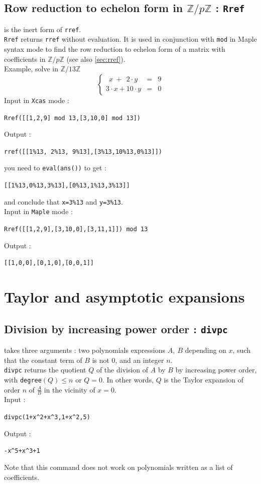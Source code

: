 \documentclass[a4paper,11pt]{book}
\newcommand{\Z}{{\mathbb{Z}}}
\begin{document}
\subsection{Row reduction to echelon form in $\Z/p\Z$ : {\tt Rref}}
  is the inert form of {\tt rref}.\\ 
{\tt Rref} returns {\tt rref} without
evaluation. 
It is used in conjunction with {\tt mod} in Maple syntax mode to 
find the row reduction to echelon form 
of a matrix with coefficients in $\Z/p\Z$ (see 
also \ref{sec:rref}).\\
Example, solve in $\Z/13\Z$
$$\left \{\begin{array}{lcr}\ \  x\ +\ \  2 \cdot y & = &9 \\3 \cdot x +10 \cdot y & =& 0 \end{array}\right.$$
Input in {\tt Xcas} mode :
\begin{center}{\tt Rref([[1,2,9] mod 13,[3,10,0] mod 13])}\end{center} 
Output :
\begin{center}{\tt rref([[1\%13, 2\%13, 9\%13],[3\%13,10\%13,0\%13]])}\end{center}
you need to {\tt eval(ans())} to get :
\begin{center}{\tt [[1\%13,0\%13,3\%13],[0\%13,1\%13,3\%13]]}\end{center} 
and conclude that {\tt x=3\%13} and  {\tt y=3\%13}.\\
Input in {\tt Maple} mode :
\begin{center}{\tt Rref([[1,2,9],[3,10,0],[3,11,1]]) mod 13}\end{center}
Output :
\begin{center}{\tt [[1,0,0],[0,1,0],[0,0,1]]}\end{center}


\section{Taylor and asymptotic expansions}
\subsection{Division by increasing power order : {\tt divpc}}
 takes three arguments : two polynomials
expressions $A,\ B$ depending on $x$,
such that the constant term of $B$ is not 0, and an integer $n$.\\
{\tt divpc} returns the  quotient $Q$ of the division of $A$ by $B$ 
by increasing power order, with  {\tt degree}$(Q)\leq n$ or $ Q=0$.
In other words, $Q$ is the Taylor expansion of order $n$ of
$\displaystyle \frac{A}{B}$ in the vicinity of $x=0$. \\ 
Input :
\begin{center}{\tt divpc(1+x\verb|^|2+x\verb|^|3,1+x\verb|^|2,5)}\end{center}
Output :
\begin{center}{\tt -x\verb|^|5+x\verb|^|3+1}\end{center}
Note that this command does not work on polynomials written
as a list of coefficients.
\end{document}
